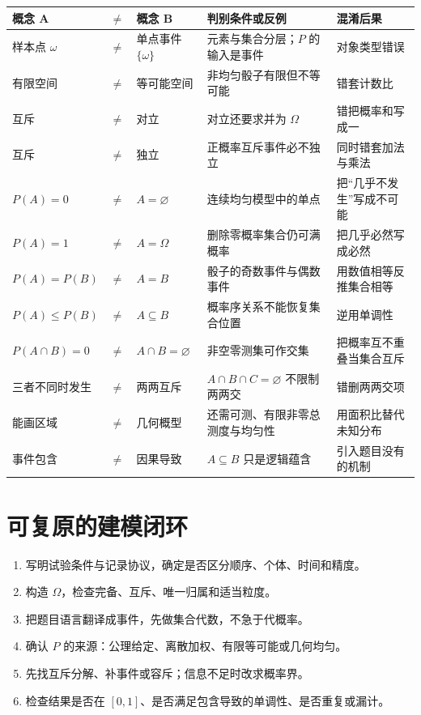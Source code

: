 \documentclass[11pt,a4paper]{ctexart}
\begin{document}
\small
\begin{longtable}{L{2.5cm}L{2.2cm}L{3.0cm}L{4.0cm}L{3.1cm}}
\toprule
\textbf{概念 A} & \textbf{$\ne$} & \textbf{概念 B} & \textbf{判别条件或反例} & \textbf{混淆后果}\\
\midrule
样本点 $\omega$ & $\ne$ & 单点事件 $\{\omega\}$ & 元素与集合分层；$P$ 的输入是事件 & 对象类型错误\\
有限空间 & $\ne$ & 等可能空间 & 非均匀骰子有限但不等可能 & 错套计数比\\
互斥 & $\ne$ & 对立 & 对立还要求并为 $\Omega$ & 错把概率和写成一\\
互斥 & $\ne$ & 独立 & 正概率互斥事件必不独立 & 同时错套加法与乘法\\
$P(A)=0$ & $\ne$ & $A=\varnothing$ & 连续均匀模型中的单点 & 把“几乎不发生”写成不可能\\
$P(A)=1$ & $\ne$ & $A=\Omega$ & 删除零概率集合仍可满概率 & 把几乎必然写成必然\\
$P(A)=P(B)$ & $\ne$ & $A=B$ & 骰子的奇数事件与偶数事件 & 用数值相等反推集合相等\\
$P(A)\le P(B)$ & $\ne$ & $A\subseteq B$ & 概率序关系不能恢复集合位置 & 逆用单调性\\
$P(A\cap B)=0$ & $\ne$ & $A\cap B=\varnothing$ & 非空零测集可作交集 & 把概率互不重叠当集合互斥\\
三者不同时发生 & $\ne$ & 两两互斥 & $A\cap B\cap C=\varnothing$ 不限制两两交 & 错删两两交项\\
能画区域 & $\ne$ & 几何概型 & 还需可测、有限非零总测度与均匀性 & 用面积比替代未知分布\\
事件包含 & $\ne$ & 因果导致 & $A\subseteq B$ 只是逻辑蕴含 & 引入题目没有的机制\\
\bottomrule
\end{longtable}
\normalsize

\section{可复原的建模闭环}

\begin{enumerate}
  \item 写明试验条件与记录协议，确定是否区分顺序、个体、时间和精度。
  \item 构造 $\Omega$，检查完备、互斥、唯一归属和适当粒度。
  \item 把题目语言翻译成事件，先做集合代数，不急于代概率。
  \item 确认 $P$ 的来源：公理给定、离散加权、有限等可能或几何均匀。
  \item 先找互斥分解、补事件或容斥；信息不足时改求概率界。
  \item 检查结果是否在 $[0,1]$、是否满足包含导致的单调性、是否重复或漏计。
\end{enumerate}
\end{document}

